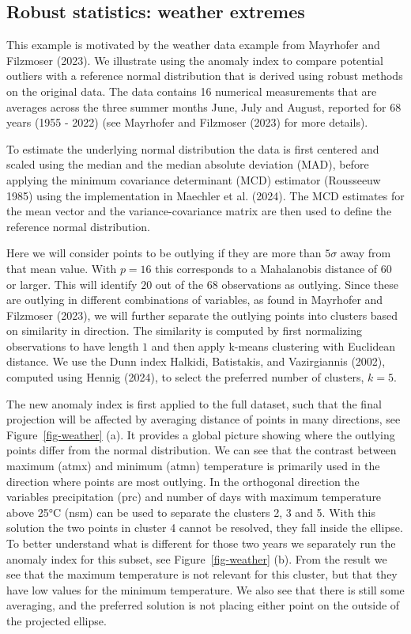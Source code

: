 \documentclass[
  12pt,
]{interact}
\begin{document}
\subsection{Robust statistics: weather
extremes}\label{robust-statistics-weather-extremes}

This example is motivated by the weather data example from Mayrhofer and
Filzmoser (2023). We illustrate using the anomaly index to compare
potential outliers with a reference normal distribution that is derived
using robust methods on the original data. The data contains 16
numerical measurements that are averages across the three summer months
June, July and August, reported for 68 years (1955 - 2022) (see
Mayrhofer and Filzmoser (2023) for more details).

To estimate the underlying normal distribution the data is first
centered and scaled using the median and the median absolute deviation
(MAD), before applying the minimum covariance determinant (MCD)
estimator (Rousseeuw 1985) using the implementation in Maechler et al.
(2024). The MCD estimates for the mean vector and the
variance-covariance matrix are then used to define the reference normal
distribution.

Here we will consider points to be outlying if they are more than
\(5 \sigma\) away from that mean value. With \(p=16\) this corresponds
to a Mahalanobis distance of \(60\) or larger. This will identify \(20\)
out of the \(68\) observations as outlying. Since these are outlying in
different combinations of variables, as found in Mayrhofer and Filzmoser
(2023), we will further separate the outlying points into clusters based
on similarity in direction. The similarity is computed by first
normalizing observations to have length \(1\) and then apply k-means
clustering with Euclidean distance. We use the Dunn index Halkidi,
Batistakis, and Vazirgiannis (2002), computed using Hennig (2024), to
select the preferred number of clusters, \(k=5\).

The new anomaly index is first applied to the full dataset, such that
the final projection will be affected by averaging distance of points in
many directions, see Figure~\ref{fig-weather} (a). It provides a global
picture showing where the outlying points differ from the normal
distribution. We can see that the contrast between maximum (atmx) and
minimum (atmn) temperature is primarily used in the direction where
points are most outlying. In the orthogonal direction the variables
precipitation (prc) and number of days with maximum temperature above
25°C (nsm) can be used to separate the clusters 2, 3 and 5. With this
solution the two points in cluster 4 cannot be resolved, they fall
inside the ellipse. To better understand what is different for those two
years we separately run the anomaly index for this subset, see
Figure~\ref{fig-weather} (b). From the result we see that the maximum
temperature is not relevant for this cluster, but that they have low
values for the minimum temperature. We also see that there is still some
averaging, and the preferred solution is not placing either point on the
outside of the projected ellipse.
\end{document}
